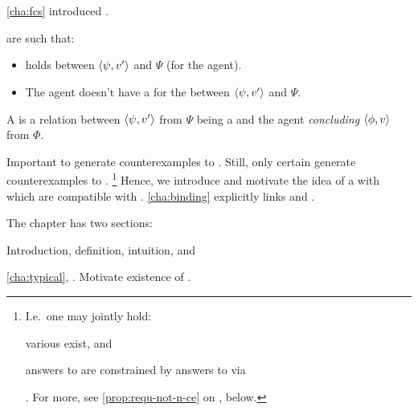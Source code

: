 \chapter{}
\label{cha:requs}

\begin{note}
  \autoref{cha:fcs} introduced .

   are such that:
  \begin{itemize}
  \item
    \ros{} holds between \(\langle \psi, v' \rangle\) and \(\Psi\) (for the agent).
  \item
    The agent doesn't have a \wit{} for the \ros{} between \(\langle \psi, v' \rangle\) and \(\Psi\).
  \end{itemize}

  A \requ{} is a relation between \(\langle \psi, v' \rangle\) from \(\Psi\) being a \fc{} and the agent \emph{concluding} \(\langle \phi, v \rangle\) from \(\Phi\).
\end{note}

\begin{note}
  Important to generate counterexamples to \issueConstraint{}.
  Still, only certain  generate counterexamples to \issueConstraint{}.%
  \footnote{
    I.e.\ one may jointly hold:
    \begin{enumerate*}[label=(\alph*)]
    \item
      various  exist, and
    \item
      answers to \qWhyV{} are constrained by answers to \qHowV{} via \issueConstraint{}
    \end{enumerate*}%
    .
    For more, see \autoref{prop:requ-not-n-ce} on , below.
  }
  Hence, we introduce and motivate the idea of a  with  which are compatible with \issueConstraint{}.
  \autoref{cha:binding} explicitly links  and \issueConstraint{}.
\end{note}

\begin{note}
  The chapter has two sections:
  \begin{TOCEnum}
  \item

    Introduction, definition, intuition, and 
  \item

    \autoref{cha:typical}, \tC{}.
    Motivate existence of .
  \end{TOCEnum}
\end{note}

